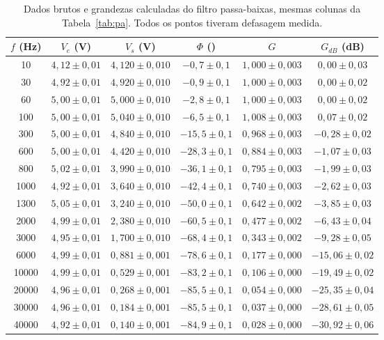 \documentclass[reprint,amsmath,amssymb,aps,prl,floatfix,onecolumn]{revtex4-2}
\begin{document}
\begin{table}[htb]
	\caption{\label{tab:pb} Dados brutos e grandezas calculadas do filtro passa-baixas, mesmas colunas da Tabela~\ref{tab:pa}. Todos os pontos tiveram defasagem medida.}
	\begin{tabular}{cccccc}
		\hline\hline
		$f$ (Hz) & $V_e$ (V) & $V_s$ (V) & $\Phi$ (\textdegree) & $G$ & $G_{dB}$ (dB) \\ \hline
		10 & $4{,}12\pm0{,}01$ & $4{,}120\pm0{,}010$ & $-0{,}7\pm0{,}1$ & $1{,}000\pm0{,}003$ & $0{,}00\pm0{,}03$ \\
		30 & $4{,}92\pm0{,}01$ & $4{,}920\pm0{,}010$ & $-0{,}9\pm0{,}1$ & $1{,}000\pm0{,}003$ & $0{,}00\pm0{,}02$ \\
		60 & $5{,}00\pm0{,}01$ & $5{,}000\pm0{,}010$ & $-2{,}8\pm0{,}1$ & $1{,}000\pm0{,}003$ & $0{,}00\pm0{,}02$ \\
		100 & $5{,}00\pm0{,}01$ & $5{,}040\pm0{,}010$ & $-6{,}5\pm0{,}1$ & $1{,}008\pm0{,}003$ & $0{,}07\pm0{,}02$ \\
		300 & $5{,}00\pm0{,}01$ & $4{,}840\pm0{,}010$ & $-15{,}5\pm0{,}1$ & $0{,}968\pm0{,}003$ & $-0{,}28\pm0{,}02$ \\
		600 & $5{,}00\pm0{,}01$ & $4{,}420\pm0{,}010$ & $-28{,}3\pm0{,}1$ & $0{,}884\pm0{,}003$ & $-1{,}07\pm0{,}03$ \\
		800 & $5{,}02\pm0{,}01$ & $3{,}990\pm0{,}010$ & $-36{,}1\pm0{,}1$ & $0{,}795\pm0{,}003$ & $-1{,}99\pm0{,}03$ \\
		1000 & $4{,}92\pm0{,}01$ & $3{,}640\pm0{,}010$ & $-42{,}4\pm0{,}1$ & $0{,}740\pm0{,}003$ & $-2{,}62\pm0{,}03$ \\
		1300 & $5{,}05\pm0{,}01$ & $3{,}240\pm0{,}010$ & $-50{,}0\pm0{,}1$ & $0{,}642\pm0{,}002$ & $-3{,}85\pm0{,}03$ \\
		2000 & $4{,}99\pm0{,}01$ & $2{,}380\pm0{,}010$ & $-60{,}5\pm0{,}1$ & $0{,}477\pm0{,}002$ & $-6{,}43\pm0{,}04$ \\
		3000 & $4{,}95\pm0{,}01$ & $1{,}700\pm0{,}010$ & $-68{,}4\pm0{,}1$ & $0{,}343\pm0{,}002$ & $-9{,}28\pm0{,}05$ \\
		6000 & $4{,}99\pm0{,}01$ & $0{,}881\pm0{,}001$ & $-78{,}6\pm0{,}1$ & $0{,}177\pm0{,}000$ & $-15{,}06\pm0{,}02$ \\
		10000 & $4{,}99\pm0{,}01$ & $0{,}529\pm0{,}001$ & $-83{,}2\pm0{,}1$ & $0{,}106\pm0{,}000$ & $-19{,}49\pm0{,}02$ \\
		20000 & $4{,}96\pm0{,}01$ & $0{,}268\pm0{,}001$ & $-85{,}5\pm0{,}1$ & $0{,}054\pm0{,}000$ & $-25{,}35\pm0{,}04$ \\
		30000 & $4{,}96\pm0{,}01$ & $0{,}184\pm0{,}001$ & $-85{,}5\pm0{,}1$ & $0{,}037\pm0{,}000$ & $-28{,}61\pm0{,}05$ \\
		40000 & $4{,}92\pm0{,}01$ & $0{,}140\pm0{,}001$ & $-84{,}9\pm0{,}1$ & $0{,}028\pm0{,}000$ & $-30{,}92\pm0{,}06$ \\ \hline\hline
	\end{tabular}
\end{table}
\end{document}
